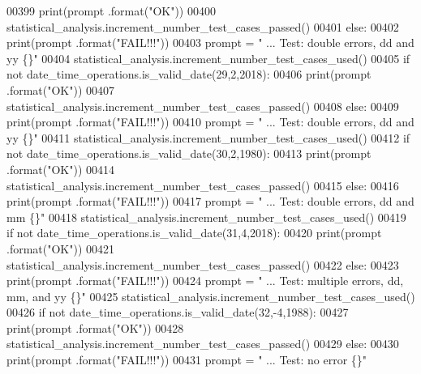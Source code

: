 \begin{DoxyCode}
00399             print(prompt .format(\textcolor{stringliteral}{"OK"}))
00400             statistical\_analysis.increment\_number\_test\_cases\_passed()
00401         \textcolor{keywordflow}{else}:
00402             print(prompt .format(\textcolor{stringliteral}{"FAIL!!!"}))
00403         prompt = \textcolor{stringliteral}{"  ... Test: double errors, dd and yy          \{\}"}
00404         statistical\_analysis.increment\_number\_test\_cases\_used()
00405         \textcolor{keywordflow}{if} \textcolor{keywordflow}{not} date\_time\_operations.is\_valid\_date(29,2,2018):
00406             print(prompt .format(\textcolor{stringliteral}{"OK"}))
00407             statistical\_analysis.increment\_number\_test\_cases\_passed()
00408         \textcolor{keywordflow}{else}:
00409             print(prompt .format(\textcolor{stringliteral}{"FAIL!!!"}))
00410         prompt = \textcolor{stringliteral}{"  ... Test: double errors, dd and yy          \{\}"}
00411         statistical\_analysis.increment\_number\_test\_cases\_used()
00412         \textcolor{keywordflow}{if} \textcolor{keywordflow}{not} date\_time\_operations.is\_valid\_date(30,2,1980):
00413             print(prompt .format(\textcolor{stringliteral}{"OK"}))
00414             statistical\_analysis.increment\_number\_test\_cases\_passed()
00415         \textcolor{keywordflow}{else}:
00416             print(prompt .format(\textcolor{stringliteral}{"FAIL!!!"}))
00417         prompt = \textcolor{stringliteral}{"  ... Test: double errors, dd and mm          \{\}"}
00418         statistical\_analysis.increment\_number\_test\_cases\_used()
00419         \textcolor{keywordflow}{if} \textcolor{keywordflow}{not} date\_time\_operations.is\_valid\_date(31,4,2018):
00420             print(prompt .format(\textcolor{stringliteral}{"OK"}))
00421             statistical\_analysis.increment\_number\_test\_cases\_passed()
00422         \textcolor{keywordflow}{else}:
00423             print(prompt .format(\textcolor{stringliteral}{"FAIL!!!"}))
00424         prompt = \textcolor{stringliteral}{"  ... Test: multiple errors, dd, mm, and yy       \{\}"}
00425         statistical\_analysis.increment\_number\_test\_cases\_used()
00426         \textcolor{keywordflow}{if} \textcolor{keywordflow}{not} date\_time\_operations.is\_valid\_date(32,-4,1988):
00427             print(prompt .format(\textcolor{stringliteral}{"OK"}))
00428             statistical\_analysis.increment\_number\_test\_cases\_passed()
00429         \textcolor{keywordflow}{else}:
00430             print(prompt .format(\textcolor{stringliteral}{"FAIL!!!"}))
00431         prompt = \textcolor{stringliteral}{"  ... Test: no error                  \{\}"}

\end{DoxyCode}
